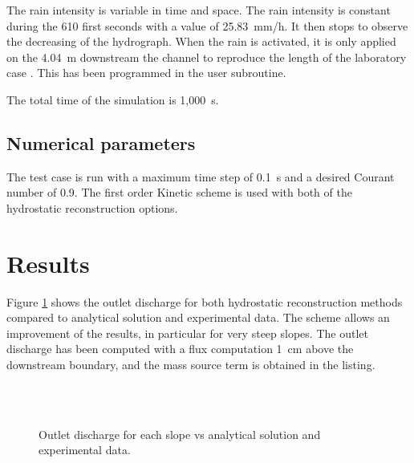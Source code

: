 The rain intensity is variable in time and space.
The rain intensity is constant during the 610 first seconds with a value of
25.83~mm/h. It then stops to observe the decreasing of the hydrograph.
When the rain is activated, it is only applied on the 4.04~m downstream the
channel to reproduce the length of the laboratory case \cite{Kirstetter2015}.
This has been programmed in the  user subroutine. 

The total time of the simulation is 1,000~s.

\subsection{Numerical parameters}

The test case is run with a maximum time step of 0.1~s and a desired Courant
number of 0.9.
The first order Kinetic scheme is used with both of the hydrostatic reconstruction options. 

\section{Results}

Figure \ref{t2d:rain_runoff:fig:result} shows the outlet discharge for both
hydrostatic reconstruction methods compared to analytical solution and experimental data.
The \cite{Chen2017} scheme allows an improvement of the results, in particular
for very steep slopes.
The outlet discharge has been computed with a flux computation 1~cm above the
downstream boundary, and the mass source term is obtained in the  listing.

\begin{figure}[H]
 \centering
 \\
 \\
 \caption{Outlet discharge for each slope vs analytical solution and experimental data.}
 \label{t2d:rain_runoff:fig:result}
\end{figure}




